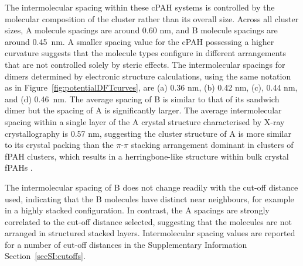 The intermolecular spacing within these cPAH systems is controlled by the molecular composition of the cluster rather than its overall size.  Across all cluster sizes, A molecule spacings are around 0.60 nm, and B molecule spacings are around 0.45~nm.  A smaller spacing value for the cPAH possessing a higher curvature suggests that the molecule types configure in different arrangements that are not controlled solely by steric effects. %
The intermolecular spacings for dimers determined by electronic structure calculations, using the same notation as in Figure~\ref{fig:potentialDFTcurves}, are (a) 0.36 nm, (b) 0.42 nm, (c), 0.44 nm, and (d) 0.46~nm. The average spacing of B is similar to that of its sandwich dimer but the spacing of A is significantly larger. The average intermolecular spacing within a single layer of the A crystal structure characterised by X-ray crystallography is 0.57 nm, suggesting the cluster structure of A is more similar to its crystal packing than the $\pi$-$\pi$ stacking arrangement dominant in clusters of fPAH clusters, which results in a herringbone-like structure within bulk crystal fPAHs \cite{Khanna200567}.  

The intermolecular spacing of B does not change readily with the cut-off distance used, indicating that the B molecules have distinct near neighbours, for example in a highly stacked configuration. In contrast, the A spacings are strongly correlated to the cut-off distance selected, suggesting that the molecules are not arranged in structured stacked layers. Intermolecular spacing values are reported for a number of cut-off distances in the Supplementary Information Section~\ref{secSI:cutoffs}.
%

